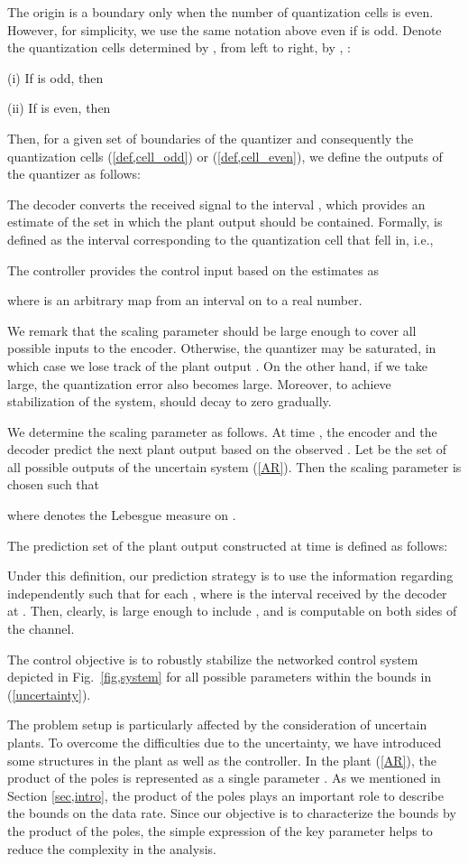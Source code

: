 \documentclass[a4paper, 11pt]{article}
\theoremstyle{definition}
\newcommand{\fref}[1]{Fig.~\ref{#1}}
\begin{document}
The origin  is a boundary only when the number  of quantization cells is
even.
However, for simplicity, we use the same notation above even if  is odd.
Denote the quantization cells determined by , from left to right,
by , :

(i) If  is odd, then


(ii) If  is even, then

Then, for a given set of boundaries  of the quantizer 
and consequently the quantization cells (\ref{def,cell_odd}) or (\ref{def,cell_even}),
we define the outputs of the quantizer as follows:


The decoder converts the received signal  to the interval
,
which provides an estimate of the set in which the plant
output  should be contained.
Formally,  is defined as the interval
corresponding to the quantization cell that  fell in, i.e.,


The controller provides the control input  based on the estimates
 as

where  is an arbitrary map from an interval on  to a real number.

We remark that the scaling parameter  should be large enough
to cover all possible inputs to the encoder. Otherwise, the quantizer may be
saturated, in which case we lose track of the plant output .
On the other hand, if we take  large, the quantization error also
becomes large. Moreover, to achieve stabilization of the system, 
should decay to zero gradually.

We determine the scaling parameter  as follows.
At time , the encoder and the decoder predict the next plant output
 based on the observed .
Let  be the set of all possible outputs
 of the uncertain system (\ref{AR}).
Then the scaling parameter  is chosen such that

where  denotes the Lebesgue measure on .

The prediction set of the plant output  constructed at time 
is defined as follows:

Under this definition, our prediction strategy is to use the information
regarding  independently such that 
for each , where  is the interval received
by the decoder at .
Then, clearly,  is large enough to include ,
and is computable on both sides of the channel.

The control objective is to robustly stabilize the networked control
system depicted in \fref{fig,system} for all possible parameters
within the bounds in (\ref{uncertainty}).


The problem setup is particularly affected by the consideration
of uncertain plants.
To overcome the difficulties due to the uncertainty, we have introduced some structures in the
plant as well as the controller.
In the plant (\ref{AR}), the product of the poles is represented as a single
parameter .
As we mentioned  in Section \ref{sec,intro}, the product of the poles plays
an important role to describe the bounds on the data rate.
Since our objective is to characterize the bounds by the product of
the poles, the simple expression of the key parameter helps to
reduce the complexity in the analysis.
\end{document}
